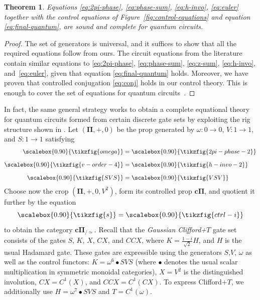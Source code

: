 \documentclass[a4paper]{article}
\theoremstyle{plain}
\newtheorem{theorem}{Theorem}
\theoremstyle{definition}
\newcommand{\tf}[1]{\scalebox{0.90}{\tikzfig{#1}}}
\newcommand{\cat}[1]{\mathbf{#1}}
\newcommand{\ccat}[1]{\mathbf{c #1}}
\newcommand{\quo}{_{/\simeq}}
\begin{document}
\begin{theorem}
	Equations \eqref{eq:2pi-phase}, \eqref{eq:phase-sum}, \eqref{eq:h-invo},
	\eqref{eq:euler} together with the control equations of
	Figure~\ref{fig:control-equations} and equation \eqref{eq:final-quantum},
	are sound and complete for quantum circuits.
\end{theorem}
\begin{proof}
	The set of generators is universal, and it suffices to show that all the required equations follow from ours. The circuit equations from the
	literature~\cite{delorme2025control} contain similar equations to
	\eqref{eq:2pi-phase}, \eqref{eq:phase-sum}, \eqref{eq:z-sum},
	\eqref{eq:h-invo}, and~\eqref{eq:euler}, given that equation
	\eqref{eq:final-quantum} holds. Moreover, we have proven that controlled
	conjugation \eqref{eq:conj} holds in our control theory. This is enough to
	cover the set of equations for quantum circuits~\cite{delorme2025control}.
\end{proof}

In fact, the same general strategy works to obtain a complete
equational theory for quantum circuits formed from certain discrete
gate sets by exploiting the rig structure shown in
\cite{carette2024easy}. Let $(\cat{\Pi},+,0)$ be the prop generated by
$\omega : 0 \to 0$, $V : 1 \to 1$, and $S : 1 \to 1$ satisfying
\begin{align}
 \tf{omega} &= \tf{2pi-phase-2} \label{eq:omega} \\[1.5ex]
 \tf{v-order-4} &= \tf{h-invo-2} \label{eq:v-order-4} \\[1.5ex]
 \tf{SVS} &= \tf{VSV} \label{eq:svs}
\end{align}
Choose now the crop $(\cat{\Pi},+,0,V^2)$, form its controlled
prop $\ccat{\Pi}$, and quotient it further by the equation
\begin{equation}
	\tf{s} = \tf{ctrl-i} \label{eq:ctrl-i}
\end{equation}
to obtain the category $\ccat \Pi\quo$. Recall that the \emph{Gaussian
Clifford+$T$} gate set~\cite{amy2020number} consists of the gates $S$,
$K$, $X$, $CX$, and $CCX$, where $K = \tfrac{1-i}{\sqrt{2}}H$, and $H$
is the usual Hadamard gate. These gates are expressible using the
generators $S$,$V$, $\omega$ as well as the control functors: $K =
\omega^6 \bullet SVS$ (where $\bullet$ denotes the usual scalar
multiplication in symmetric monoidal categories), $X = V^2$ is the
distinguished involution, $CX = C^1(X)$, and $CCX = C^1(CX)$. To
express Clifford+$T$, we additionally use $H = \omega^7 \bullet SVS$
and $T = C^1(\omega)$.
\end{document}
